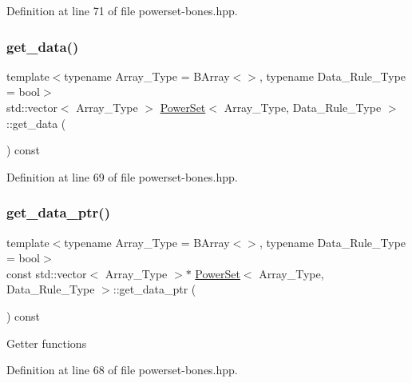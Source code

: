 Definition at line 71 of file powerset-\/bones.\+hpp.

\mbox{\label{class_power_set_a4de44631d9a7967db4dd791d42166115}} 
\subsubsection{\texorpdfstring{get\+\_\+data()}{get\_data()}}
{\footnotesize\ttfamily template$<$typename Array\+\_\+\+Type  = B\+Array$<$$>$, typename Data\+\_\+\+Rule\+\_\+\+Type  = bool$>$ \\
std\+::vector$<$ Array\+\_\+\+Type $>$ \hyperlink{class_power_set}{Power\+Set}$<$ Array\+\_\+\+Type, Data\+\_\+\+Rule\+\_\+\+Type $>$\+::get\+\_\+data (\begin{DoxyParamCaption}{ }\end{DoxyParamCaption}) const\hspace{0.3cm}{\ttfamily [inline]}}



Definition at line 69 of file powerset-\/bones.\+hpp.

\mbox{\label{class_power_set_a99cf1aa56e63a16c023bf7057b0b9288}} 
\subsubsection{\texorpdfstring{get\+\_\+data\+\_\+ptr()}{get\_data\_ptr()}}
{\footnotesize\ttfamily template$<$typename Array\+\_\+\+Type  = B\+Array$<$$>$, typename Data\+\_\+\+Rule\+\_\+\+Type  = bool$>$ \\
const std\+::vector$<$ Array\+\_\+\+Type $>$$\ast$ \hyperlink{class_power_set}{Power\+Set}$<$ Array\+\_\+\+Type, Data\+\_\+\+Rule\+\_\+\+Type $>$\+::get\+\_\+data\+\_\+ptr (\begin{DoxyParamCaption}{ }\end{DoxyParamCaption}) const\hspace{0.3cm}{\ttfamily [inline]}}

Getter functions 

Definition at line 68 of file powerset-\/bones.\+hpp.

\mbox{\label{class_power_set_a8eefc9606c6339938a8d9adcd0d7e153}} 
